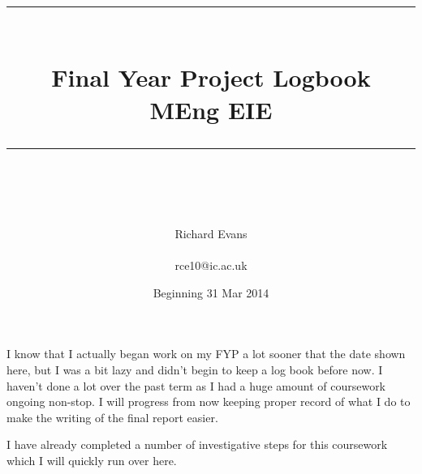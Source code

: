 \documentclass[idxtotoc,hyperref,openany]{labbook} %
\newcommand{\HRule}{\rule{\linewidth}{0.5mm}} %
\begin{document}

\frontmatter %
\title{
\begin{center}
\HRule \\[0.4cm]
{\Huge \bfseries Final Year Project Logbook \\[0.5cm] \Large MEng EIE}\\[0.4cm] %
\HRule \\[1.5cm]
\end{center}
}
\author{\Huge Richard Evans \\ \\ \LARGE rce10@ic.ac.uk \\[2cm]} %
\date{Beginning 31 Mar 2014} %
\maketitle

\tableofcontents

\mainmatter %









I know that I actually began work on my FYP a lot sooner that the date shown here, but I was a bit lazy and didn't begin to keep a log book before now.  I haven't done a lot over the past term as I had a huge amount of coursework ongoing non-stop.  I will progress from now keeping proper record of what I do to make the writing of the final report easier.


I have already completed a number of investigative steps for this coursework which I will quickly run over here.
\end{document}
